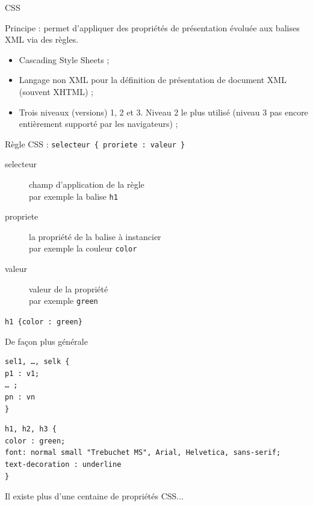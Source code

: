 \begin{frame}{CSS}

Principe : permet d'appliquer des propri\'et\'es de pr\'esentation \'evolu\'ee aux balises XML via des règles.

\begin{itemize}
\item Cascading Style Sheets ;
\item Langage non XML pour la d\'efinition de pr\'esentation de document XML (souvent XHTML) ;
\item Trois niveaux (versions) 1, 2 et 3. Niveau 2 le plus utilis\'e (niveau 3 pas encore entièrement support\'e par les navigateurs) ;
\end{itemize}

\cite{w3c/css}

\framebreak

R\`egle CSS : \verb?selecteur { proriete : valeur }?

\bigskip

\begin{description}
\item[selecteur] champ d'application de la r\`egle \\
			par exemple la balise \verb?h1?
\item[propriete] la propri\'et\'e de la balise \`a instancier \\
			par exemple la couleur \verb?color?
\item[valeur] valeur de la propri\'et\'e \\
			par exemple \verb?green?
\end{description}

\begin{center}
\verb?h1 {color : green}?
\end{center}

\framebreak

De façon plus g\'en\'erale

\bigskip

\begin{verbatim}
sel1, …, selk { 
p1 : v1;
… ;
pn : vn 
}
\end{verbatim}

\begin{verbatim}
h1, h2, h3 {
color : green; 
font: normal small "Trebuchet MS", Arial, Helvetica, sans-serif;
text-decoration : underline
}
\end{verbatim}

Il existe plus d'une centaine de propri\'et\'es CSS...


\end{frame}
